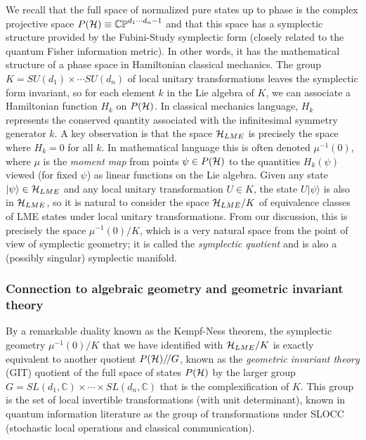 \documentclass[12pt]{article}
\theoremstyle{definition}
\newcommand{\GITquot}{/\!/}
\begin{document}
We recall that the full space of normalized pure states up
to phase is the complex projective space $P({\cal H}) \equiv
\mathbb{CP}^{d_1 \cdots d_n -1}$ and that this space has a symplectic
structure provided by the Fubini-Study symplectic form (closely
related to the quantum Fisher information metric). In other words, it
has the mathematical structure of a phase space in Hamiltonian
classical mechanics.  The group $K = SU(d_1) \times \cdots SU(d_n)$ of
local unitary transformations leaves the symplectic form invariant, so
for each element $k$ in the Lie algebra of $K$, we can associate a
Hamiltonian function $H_k$ on $P({\cal H})$. In classical mechanics
language, $H_k$ represents the conserved quantity associated with the
infinitesimal symmetry generator $k$. A key observation is that the
space ${\cal H}_{LME}$ is precisely the space where $H_k = 0$ for all
$k$. In mathematical language this is often denoted $\mu^{-1}(0)$,
where $\mu$ is the {\it moment map} from points $\psi \in P({\cal H})$
to the quantities $H_k(\psi)$ viewed (for fixed $\psi$) as linear
functions on the Lie algebra. Given any state $|\psi \rangle \in {\cal
H}_{LME}$ and any local unitary transformation $U \in K$, the state $U
|\psi \rangle$ is also in ${\cal H}_{LME}$, so it is natural to
consider the space ${\cal H}_{LME}/K$ of equivalence classes of LME
states under local unitary transformations. From our discussion, this
is precisely the space $\mu^{-1}(0)/K$, which is a very natural space
from the point of view of symplectic geometry; it is called the
\emph{symplectic quotient} and is also a (possibly singular) symplectic manifold.

\subsubsection{Connection to algebraic geometry and geometric invariant theory}

By a remarkable duality known as the Kempf-Ness theorem, the
symplectic geometry $\mu^{-1}(0)/K$ that we have identified with
${\cal H}_{LME}/K$ is exactly equivalent to another quotient $P({\cal
H})\GITquot G$, known as the {\it geometric invariant theory} (GIT)
quotient of the full space of states $P({\cal H})$ by the larger group
$G = SL(d_1, \mathbb{C}) \times \cdots \times SL(d_n, \mathbb{C})$
that is the complexification of $K$. This group is the set of local
invertible transformations (with unit determinant), known in quantum
information literature as the group of transformations under SLOCC
(stochastic local operations and classical communication).
\end{document}
